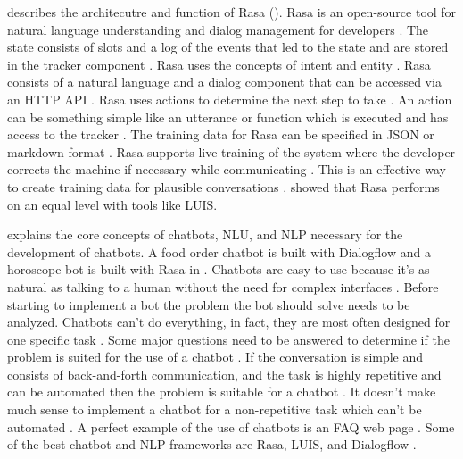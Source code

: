 \citet{rasabocklisch2017} describes the architecutre and function of Rasa (\citet{singhbuilding, braunEvaluatingNLU, buiildChatbotsPython}).
Rasa is an open-source tool for natural language understanding and dialog management for developers \cite{rasabocklisch2017}.
The state consists of slots and a log of the events that led to the state and are stored in the tracker component \cite{rasabocklisch2017}. 
Rasa uses the concepts of intent and entity \cite{rasabocklisch2017}. 
Rasa consists of a natural language and a dialog component that can be accessed via an HTTP API \cite{rasabocklisch2017}.
Rasa uses actions to determine the next step to take \cite{rasabocklisch2017}. 
An action can be something simple like an utterance or function which is executed and has access to the tracker \cite{rasabocklisch2017}.
The training data for Rasa can be specified in JSON or markdown format \cite{rasabocklisch2017}.
Rasa supports live training of the system where the developer corrects the machine if necessary while communicating \cite{rasabocklisch2017}.
This is an effective way to create training data for plausible conversations \cite{rasabocklisch2017}.
\citet{braunEvaluatingNLU} showed that Rasa performs on an equal level with tools like LUIS.

\citet{buiildChatbotsPython} explains the core concepts of chatbots, NLU, and NLP necessary for the development of chatbots.
A food order chatbot is built with Dialogflow and a horoscope bot is built with Rasa in \citet{buiildChatbotsPython}.
Chatbots are easy to use because it's as natural as talking to a human without the need for complex interfaces \cite{buiildChatbotsPython}.
Before starting to implement a bot the problem the bot should solve needs to be analyzed.
Chatbots can't do everything, in fact, they are most often designed for one specific task \cite{buiildChatbotsPython}.
Some major questions need to be answered to determine if the problem is suited for the use of a chatbot \cite{buiildChatbotsPython}.
If the conversation is simple and consists of back-and-forth communication, and the task is 
highly repetitive and can be automated then the problem is suitable for a chatbot \cite{buiildChatbotsPython}.
It doesn't make much sense to implement a chatbot for a non-repetitive task which can't be automated \cite{buiildChatbotsPython}.
A perfect example of the use of chatbots is an FAQ web page \cite{buiildChatbotsPython}.
Some of the best chatbot and NLP frameworks are Rasa, LUIS, and Dialogflow \cite{buiildChatbotsPython}.

